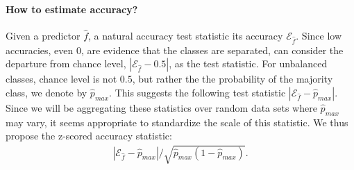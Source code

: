 \documentclass[12pt,a4paper]{article}
\theoremstyle{definition}
\newcommand{\hyp}{f} %
\newcommand{\hypEstim}{\hat{\hyp}} %
\newcommand{\acc}{\mathcal{E}}
\newcommand{\majority}{\hat{p}_{max}}
\begin{document}
\paragraph{How to estimate accuracy?}
\label{sec:estimate_accuracy}
Given a predictor $\hypEstim$, a natural accuracy test statistic its accuracy $\acc_{\hypEstim}$.
Since low accuracies, even $0$, are evidence that the classes are separated, can consider the departure from chance level, $|\acc_{\hypEstim}-0.5|$, as the test statistic.
For unbalanced classes, chance level is not $0.5$, but rather the the probability of the majority class, we denote by $\majority$.
This suggests the following test statistic $|\acc_{\hypEstim}-\majority|$.
Since we will be aggregating these statistics over random data sets where $\majority$ may vary, it seems appropriate to standardize the scale of this statistic. 
We thus propose the z-scored accuracy statistic: 
\begin{align}
\label{eq:z_scored_accuracy}
	|\acc_{\hypEstim}-\majority|/\sqrt{\majority(1-\majority)}.
\end{align} 
\end{document}
